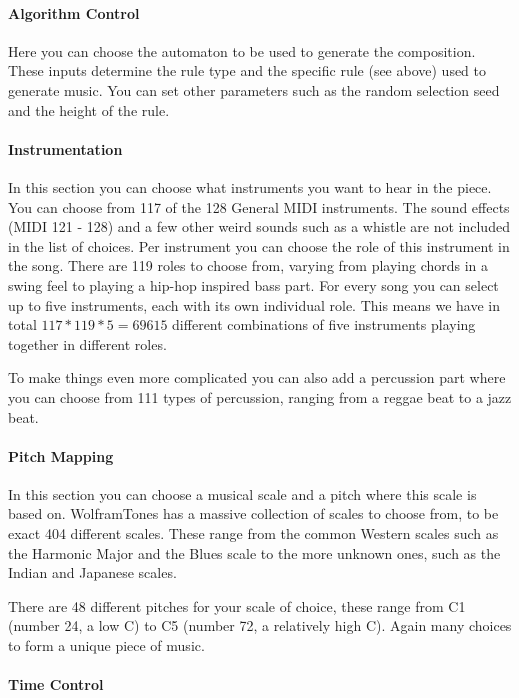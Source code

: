 \documentclass[12pt]{article}
\begin{document}
\paragraph{Algorithm Control}

Here you can choose the automaton to be used to generate the composition. These inputs determine the rule type and the specific rule (see above) used to generate music. You can set other parameters such as the random selection seed and the height of the rule.

\paragraph{Instrumentation}

In this section you can choose what instruments you want to hear in the piece. You can choose from 117 of the 128 General MIDI instruments. The sound effects (MIDI 121 - 128) and a few other weird sounds such as a whistle are not included in the list of choices. Per instrument you can choose the role of this instrument in the song. There are 119 roles to choose from, varying from playing chords in a swing feel to playing a hip-hop inspired bass part. For every song you can select up to five instruments, each with its own individual role. This means we have in total $117*119*5 = 69615$ different combinations of five instruments playing together in different roles.

To make things even more complicated you can also add a percussion part where you can choose from 111 types of percussion, ranging from a reggae beat to a jazz beat.

\paragraph{Pitch Mapping}

 In this section you can choose a musical scale and a pitch where this scale is based on. WolframTones has a massive collection of scales to choose from, to be exact 404 different scales. These range from the common Western scales such as the Harmonic Major and the Blues scale to the more unknown ones, such as the Indian and Japanese scales.

There are 48 different pitches for your scale of choice, these range from C1 (number 24, a low C) to C5 (number 72, a relatively high C). Again many choices to form a unique piece of music.

\paragraph{Time Control}
\end{document}
